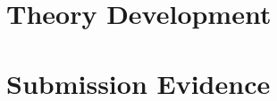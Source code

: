 \documentclass[11pt,a4paper]{article}
\theoremstyle{remark}
\begin{document}









\part{Theory Development}






\part{Submission Evidence}





\end{document}
